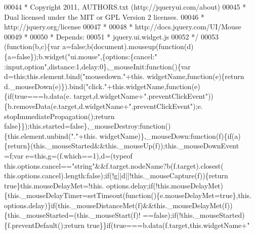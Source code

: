 \begin{DoxyCode}
00044 \textcolor{comment}{ * Copyright 2011, AUTHORS.txt (http://jqueryui.com/about)}
00045 \textcolor{comment}{ * Dual licensed under the MIT or GPL Version 2 licenses.}
00046 \textcolor{comment}{ * http://jquery.org/license}
00047 \textcolor{comment}{ *}
00048 \textcolor{comment}{ * http://docs.jquery.com/UI/Mouse}
00049 \textcolor{comment}{ *}
00050 \textcolor{comment}{ * Depends:}
00051 \textcolor{comment}{ *  jquery.ui.widget.js}
00052 \textcolor{comment}{ */}
00053 (\textcolor{keyword}{function}(b,c)\{var a=\textcolor{keyword}{false};b(document).mouseup(\textcolor{keyword}{function}(d)\{a=\textcolor{keyword}{false}\});b.widget(\textcolor{stringliteral}{"ui.mouse"},\{options:\{cancel:\textcolor{stringliteral}{"
      :input,option"},distance:1,delay:0\},\_mouseInit:\textcolor{keyword}{function}()\{var d=\textcolor{keyword}{this};this.element.bind(\textcolor{stringliteral}{"mousedown."}+this.
      widgetName,\textcolor{keyword}{function}(e)\{\textcolor{keywordflow}{return} d.\_mouseDown(e)\}).bind(\textcolor{stringliteral}{"click."}+this.widgetName,\textcolor{keyword}{function}(e)\{\textcolor{keywordflow}{if}(\textcolor{keyword}{true}===b.data(e.
      target,d.widgetName+\textcolor{stringliteral}{".preventClickEvent"}))\{b.removeData(e.target,d.widgetName+\textcolor{stringliteral}{".preventClickEvent"});e.
      stopImmediatePropagation();\textcolor{keywordflow}{return} \textcolor{keyword}{false}\}\});this.started=\textcolor{keyword}{false}\},\_mouseDestroy:\textcolor{keyword}{function}()\{this.element.unbind(\textcolor{stringliteral}{"."}+this.
      widgetName)\},\_mouseDown:\textcolor{keyword}{function}(f)\{\textcolor{keywordflow}{if}(a)\{\textcolor{keywordflow}{return}\}(this.\_mouseStarted&&this.\_mouseUp(f));this.\_mouseDownEvent
      =f;var e=\textcolor{keyword}{this},g=(f.which==1),d=(typeof this.options.cancel==\textcolor{stringliteral}{"string"}&&f.target.nodeName?b(f.target).closest(
      this.options.cancel).length:\textcolor{keyword}{false});\textcolor{keywordflow}{if}(!g||d||!this.\_mouseCapture(f))\{\textcolor{keywordflow}{return} \textcolor{keyword}{true}\}this.mouseDelayMet=!this.
      options.delay;\textcolor{keywordflow}{if}(!this.mouseDelayMet)\{this.\_mouseDelayTimer=setTimeout(\textcolor{keyword}{function}()\{e.mouseDelayMet=\textcolor{keyword}{true}\},this.
      options.delay)\}\textcolor{keywordflow}{if}(this.\_mouseDistanceMet(f)&&this.\_mouseDelayMet(f))\{this.\_mouseStarted=(this.\_mouseStart(f)!
      ==\textcolor{keyword}{false});\textcolor{keywordflow}{if}(!this.\_mouseStarted)\{f.preventDefault();\textcolor{keywordflow}{return} \textcolor{keyword}{true}\}\}\textcolor{keywordflow}{if}(\textcolor{keyword}{true}===b.data(f.target,\textcolor{keyword}{this}.widgetName+\textcolor{stringliteral}{"
}
\end{DoxyCode}
